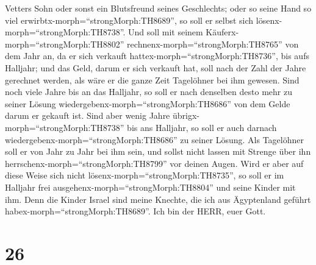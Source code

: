 Vetters Sohn oder sonst ein Blutsfreund seines Geschlechts; oder so
seine Hand so viel erwirbtx-morph=``strongMorph:TH8689'', so soll er
selbst sich lösenx-morph=``strongMorph:TH8738''.  Und soll
mit seinem Käuferx-morph=``strongMorph:TH8802''
rechnenx-morph=``strongMorph:TH8765'' von dem Jahr an, da er sich
verkauft hattex-morph=``strongMorph:TH8736'', bis aufs Halljahr; und das
Geld, darum er sich verkauft hat, soll nach der Zahl der Jahre gerechnet
werden, als wäre er die ganze Zeit Tagelöhner bei ihm gewesen.
 Sind noch viele Jahre bis an das Halljahr, so soll er nach
denselben desto mehr zu seiner Lösung
wiedergebenx-morph=``strongMorph:TH8686'' von dem Gelde darum er gekauft
ist.  Sind aber wenig Jahre
übrigx-morph=``strongMorph:TH8738'' bis ans Halljahr, so soll er auch
darnach wiedergebenx-morph=``strongMorph:TH8686'' zu seiner Lösung.
 Als Tagelöhner soll er von Jahr zu Jahr bei ihm sein, und
sollst nicht lassen mit Strenge über ihn
herrschenx-morph=``strongMorph:TH8799'' vor deinen Augen. 
Wird er aber auf diese Weise sich nicht
lösenx-morph=``strongMorph:TH8735'', so soll er im Halljahr frei
ausgehenx-morph=``strongMorph:TH8804'' und seine Kinder mit ihm.
 Denn die Kinder Israel sind meine Knechte, die ich aus
Ägyptenland geführt habex-morph=``strongMorph:TH8689''. Ich bin der
HERR, euer Gott.

\hypertarget{section-25}{%
\section{26}\label{section-25}}

